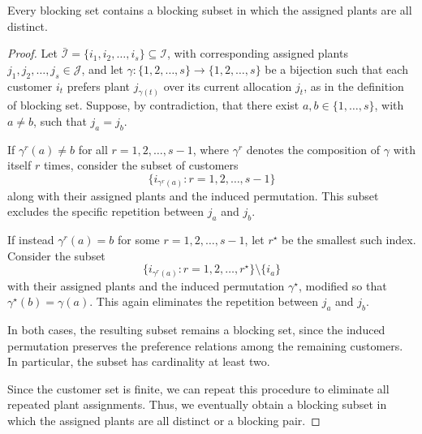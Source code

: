 \documentclass[10pt,a4paper]{amsart}
\def\I{\mathcal{I}}
\def\J{\mathcal{J}}
\begin{document}
\begin{lemma}
Every blocking set contains a blocking subset in which the assigned plants are all distinct.
\end{lemma}

\begin{proof}
Let \( \bar{\I} = \{i_1, i_2, \dots, i_s\} \subseteq \I \), with corresponding assigned plants \( j_1, j_2, \dots, j_s \in \J \), and let \( \gamma : \{1, 2, \dots, s\} \to \{1, 2, \dots, s\} \) be a bijection such that each customer \( i_t \) prefers plant \( j_{\gamma(t)} \) over its current allocation \( j_t \), as in the definition of blocking set. Suppose, by contradiction, that there exist \( a, b \in \{1, \dots, s\} \), with \( a \ne b \), such that \( j_a = j_b \).

If \( \gamma^r(a) \ne b \) for all \( r = 1, 2, \dots, s-1 \), where \( \gamma^r \) denotes the composition of \( \gamma \) with itself \( r \) times, consider the subset of customers
\[
    \{i_{\gamma^r(a)} : r = 1, 2, \dots, s-1\}
\]
along with their assigned plants and the induced permutation. This subset excludes the specific repetition between \( j_a \) and \( j_b \).

If instead \( \gamma^r(a) = b \) for some \( r = 1, 2, \dots, s-1 \), let \( r^\star \) be the smallest such index. Consider the subset
\[
    \{i_{\gamma^r(a)} : r = 1, 2, \dots, r^\star\} \setminus \{i_a\}
\]
with their assigned plants and the induced permutation \( \gamma^\star \), modified so that \( \gamma^\star(b) = \gamma(a) \). This again eliminates the repetition between \( j_a \) and \( j_b \).

In both cases, the resulting subset remains a blocking set, since the induced permutation preserves the preference relations among the remaining customers. In particular, the subset has cardinality at least two.

Since the customer set is finite, we can repeat this procedure to eliminate all repeated plant assignments. Thus, we eventually obtain a blocking subset in which the assigned plants are all distinct or a blocking pair.
\end{proof}
\end{document}
